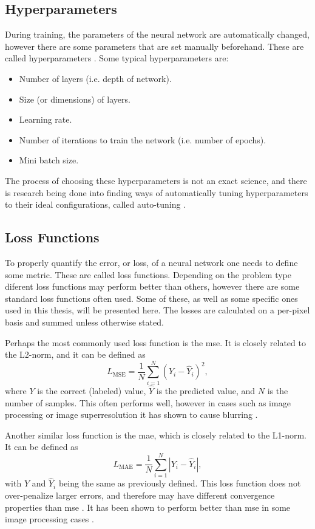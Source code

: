 \subsection{Hyperparameters}
During training, the parameters of the neural network are automatically changed, however there are some parameters that are set manually beforehand. These are called hyperparameters \cite{claesen2015hyperparameter}. Some typical hyperparameters are:
\begin{itemize}
    \item Number of layers (i.e. depth of network).
    \item Size (or dimensions) of layers.
    \item Learning rate.
    \item Number of iterations to train the network (i.e. number of epochs).
    \item Mini batch size.
\end{itemize}

The process of choosing these hyperparameters is not an exact science, and there is research being done into finding ways of automatically tuning hyperparameters to their ideal configurations, called auto-tuning \cite{autotuning}.

\subsection{Loss Functions}
To properly quantify the error, or loss, of a neural network one needs to define some metric. These are called loss functions. Depending on the problem type diferent loss functions may perform better than others, however there are some standard loss functions often used. Some of these, as well as some specific ones used in this thesis, will be presented here. The losses are calculated on a per-pixel basis and summed unless otherwise stated. 

Perhaps the most commonly used loss function is the \acrfull{mse}. It is closely related to the L2-norm, and it can be defined as
\begin{equation}
    \label{eq:lossmse}
    L_{\text{MSE}} = \frac{1}{N} \sum_{i=1}^N(Y_i - \hat{Y}_i)^2,
\end{equation}
where $Y$ is the correct (labeled) value,  $\hat{Y}$ is the predicted value, and $N$ is the number of samples. This often performs well, however in cases such as image processing or image superresolution it has shown to cause blurring \cite{7797130}.

Another similar loss function is the \acrfull{mae}, which is closely related to the L1-norm. It can be defined as
\begin{equation}
    \label{eq:lossmae}
    L_{\text{MAE}} = \frac{1}{N} \sum_{i=1}^N |Y_i - \hat{Y}_i|,
\end{equation}
with $Y$ and $\hat{Y}_i$ being the same as previously defined. This loss function does not over-penalize larger errors, and therefore may have different convergence properties than \acrshort{mse} \cite{7797130}. It has been shown to perform better than \acrshort{mse} in some image processing cases \cite{7797130,10.1002/mp.13713}. 

